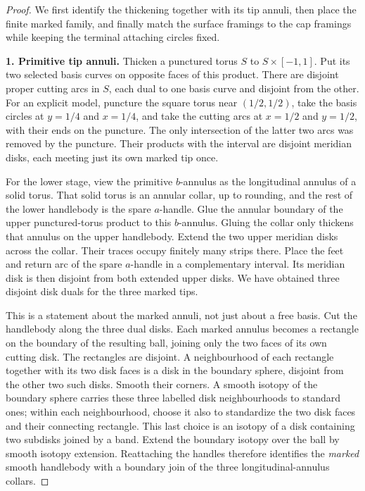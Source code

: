 \begin{proof}
We first identify the thickening together with its tip annuli, then
place the finite marked family, and finally match the surface framings
to the cap framings while keeping the terminal attaching circles fixed.

\smallskip\noindent\textbf{1. Primitive tip annuli.}\quad
Thicken a punctured torus \(S\) to \(S\times[-1,1]\).
Put its two selected basis curves on opposite faces of this product.
There are disjoint proper cutting arcs in \(S\), each dual to one basis
curve and disjoint from the other. For an explicit model, puncture the
square torus near \((1/2,1/2)\), take the basis circles at \(y=1/4\)
and \(x=1/4\), and take the cutting arcs at \(x=1/2\) and \(y=1/2\),
with their ends on the puncture. The only intersection of the latter
two arcs was removed by the puncture. Their products with the interval
are disjoint meridian disks, each meeting just its own marked tip once.

For the lower stage, view the primitive \(b\)-annulus as the longitudinal
annulus of a solid torus. That solid torus is an annular collar, up to
rounding, and the rest of the lower handlebody is the spare \(a\)-handle.
Glue the annular boundary of the upper punctured-torus product to this
\(b\)-annulus. Gluing the collar only thickens that annulus on the upper
handlebody. Extend the two upper meridian disks across the collar.
Their traces occupy finitely many strips there. Place the feet and return
arc of the spare \(a\)-handle in a complementary interval. Its meridian
disk is then disjoint from both extended upper disks. We have obtained
three disjoint disk duals for the three marked tips.

This is a statement about the marked annuli, not just about a free basis.
Cut the handlebody along the three dual disks. Each marked annulus becomes
a rectangle on the boundary of the resulting ball, joining only the two
faces of its own cutting disk. The rectangles are disjoint. A neighbourhood
of each rectangle together with its two disk faces is a disk in the
boundary sphere, disjoint from the other two such disks. Smooth their
corners. A smooth isotopy of the boundary sphere carries these three
labelled disk neighbourhoods to standard ones; within each neighbourhood,
choose it also to standardize the two disk faces and their connecting
rectangle. This last choice is an isotopy of a disk containing two
subdisks joined by a band. Extend the boundary isotopy over the ball
by smooth isotopy extension. Reattaching the handles therefore identifies
the \emph{marked} smooth handlebody with a boundary join of the three
longitudinal-annulus collars.


\end{proof}
